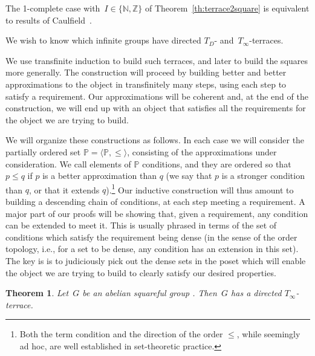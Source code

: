 \documentclass[12pt,a4paper]{article}
\newtheorem{thm}{Theorem}[section]
\newcommand{\Z}{\mathbb{Z}}
\newcommand{\N}{\mathbb{N}}
\renewcommand{\P}{\mathbb{P}}
\begin{document}
The 1-complete case with~$I \in \{ \N, \Z \}$ of Theorem~\ref{th:terrace2square} is equivalent to results of Caulfield~\cite{Caulfield96}.

We wish to know which infinite groups have directed $T_D$- and~$T_{\infty}$-terraces.  

We use transfinite induction to build such terraces, and later to build the squares more generally. 
The construction will proceed by building better and better approximations to the object in transfinitely many steps, using each step to satisfy a requirement. Our approximations will be coherent and, at the end of the construction, we will end up with an object that satisfies all the requirements for the object we are trying to build.

We will organize these constructions as follows. In each case we will consider the partially ordered set $\P=\langle \P, \leq\rangle$, consisting of the approximations under consideration. We call elements of $\P$ conditions, and they are ordered so that $p\leq q$ if $p$ is a better approximation than $q$ (we say that $p$ is a stronger condition than $q$, or that it extends $q$).\footnote{Both the term condition and the direction of the order $\leq$, while seemingly ad hoc, are well established in set-theoretic practice.} Our inductive construction will thus amount to building a descending chain of conditions, at each step meeting a requirement. A major part of our proofs will be showing that, given a requirement, any condition can be extended to meet it. This is usually phrased in terms of the set of conditions which satisfy the requirement being dense (in the sense of the order topology, i.e., for a set to be dense, any condition has an extension in this set). The key is is to judiciously pick out the dense sets in the poset which will enable the object we are trying to build to clearly satisfy our desired properties.

\begin{thm}\label{th:T_infty}
Let~$G$ be an abelian squareful group%
. Then~$G$ has a directed $T_{\infty}$-terrace.
\end{thm}
\end{document}
